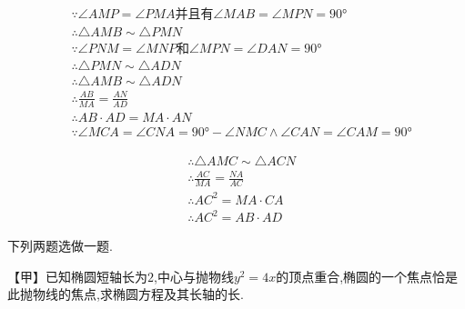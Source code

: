 \begin{questions}
	\begin{solution}
		\begin{align*}
			 & \because \angle{AMP} = \angle{PMA} \text{并且有} \angle{MAB} = \angle{MPN} = \ang{90}                  \\
			 & \therefore \triangle{AMB} \sim \triangle{PMN}                                                          \\
			 & \because \angle{PNM} = \angle{MNP} \text{和} \angle{MPN} = \angle{DAN} = \ang{90}                      \\
			 & \therefore \triangle{PMN} \sim \triangle{ADN}                                                          \\
			 & \therefore \triangle{AMB} \sim \triangle{ADN}                                                          \\
			 & \therefore \frac{AB}{MA} = \frac{AN}{AD}                                                               \\
			 & \therefore AB\cdot AD = MA \cdot AN                                                                    \\
			 & \because \angle{MCA} = \angle{CNA} = \ang{90} - \angle{NMC} \land \angle{CAN} = \angle{CAM} = \ang{90}
		\end{align*}

		\begin{align*}
			 & \therefore \triangle{AMC} \sim \triangle{ACN} \\
			 & \therefore \frac{AC}{MA} = \frac{NA}{AC}      \\
			 & \therefore AC^2 = MA \cdot CA                 \\
			 & \therefore AC^2 = AB \cdot AD
		\end{align*}
	\end{solution}
	\question[10] 下列两题选做一题.

	【甲】已知椭圆短轴长为$2$,中心与抛物线$y^2=4x$的顶点重合,椭圆的一个焦点恰是此抛物线的焦点,求椭圆方程及其长轴的长.
	\begin{solution}
		\begin{center}
		\end{center}


\end{solution}
\end{questions}

